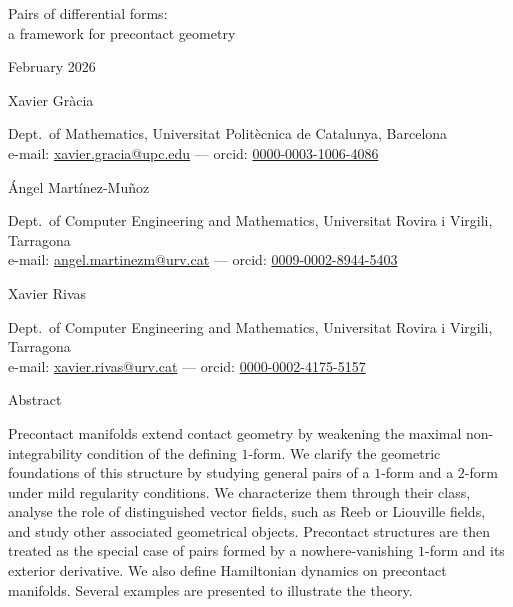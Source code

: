 \documentclass[11pt,twoside]{article}
\theoremstyle{plain}
\theoremstyle{definition}
\begin{document}
\parskip=3pt

{\huge\sffamily\raggedright
Pairs of differential forms:\\[10pt]
a framework for precontact geometry
}

\vspace{1em}

{\large\raggedright{} February 2026
}

\vspace{1em}


{\Large\raggedright\sffamily
    Xavier Gràcia
}\vspace{1mm}\newline
{\raggedright
    Dept.\ of Mathematics, Universitat Politècnica de Catalunya, Barcelona\\
    e-mail: 
    \href{mailto:xavier.gracia@upc.edu}{xavier.gracia@upc.edu} --- {\sc orcid}: 
    \href{https://orcid.org/0000-0003-1006-4086}{0000-0003-1006-4086}
}


\medskip


{\Large\raggedright\sffamily
    Ángel Martínez-Muñoz
}\vspace{1mm}\newline
{\raggedright
    Dept.\ of Computer Engineering and Mathematics, Universitat Rovira i Virgili, Tarragona\\
    e-mail: \href{mailto:angel.martinezm@urv.cat}{angel.martinezm@urv.cat} --- {\sc orcid}: \href{https://orcid.org/0009-0002-8944-5403}{0009-0002-8944-5403}
}

\medskip


{\Large\raggedright\sffamily
    Xavier Rivas
}\vspace{1mm}\newline
{\raggedright
    Dept.\ of Computer Engineering and Mathematics, Universitat Rovira i Virgili, Tarragona\\
    e-mail: \href{mailto:xavier.rivas@urv.cat}{xavier.rivas@urv.cat} --- {\sc orcid}: \href{https://orcid.org/0000-0002-4175-5157}{0000-0002-4175-5157}
}

\vspace{.7em}

{\large\bf\raggedright
    Abstract
}\vspace{1mm}\newline
{\parindent 0pt
Precontact manifolds extend contact geometry by weakening the maximal non-integrability condition of the defining $1$-form. 
We clarify the geometric foundations of this structure by studying general pairs of a $1$-form and a $2$-form under mild regularity conditions. 
We characterize them through their class, analyse the role of distinguished vector fields, such as Reeb or Liouville fields, and study other associated geometrical objects. 
Precontact structures are then treated as the special case of pairs formed by a nowhere-vanishing $1$-form and its exterior derivative. 
We also define Hamiltonian dynamics on precontact manifolds.
Several examples are presented to illustrate the theory.
}
\smallskip
\end{document}
